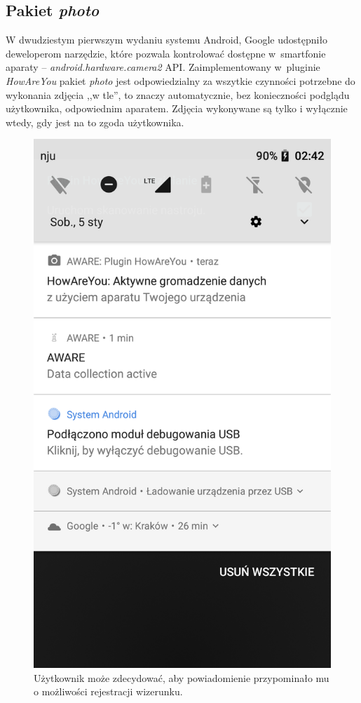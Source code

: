 \subsection{Pakiet \textit{photo}}

W dwudziestym pierwszym wydaniu systemu Android, Google udostępniło deweloperom narzędzie, które pozwala kontrolować dostępne w~smartfonie aparaty – \textit{android.hardware.camera2} API. Zaimplementowany w~pluginie \textit{HowAreYou} pakiet \textit{photo} jest odpowiedzialny za wszytkie czynności potrzebne do wykonania zdjęcia ,,w tle'', to znaczy automatycznie, bez konieczności podglądu użytkownika, odpowiednim aparatem. Zdjęcia wykonywane są tylko i wyłącznie wtedy, gdy jest na to zgoda użytkownika.

\begin{figure}[H]
	\centering
	\includegraphics[scale=0.13]{rozdzial3/screen-background.png}
	\caption{Użytkownik może zdecydować, aby powiadomienie przypominało mu o możliwości rejestracji wizerunku.}
\end{figure}

